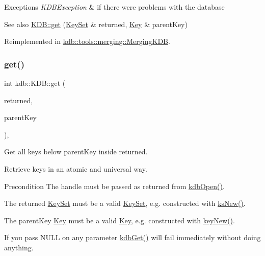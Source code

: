\begin{DoxyExceptions}{Exceptions}
{\em K\+D\+B\+Exception} & if there were problems with the database\\
\hline
\end{DoxyExceptions}
\begin{DoxySeeAlso}{See also}
\hyperlink{classkdb_1_1KDB_a0419ffbc273c89756bc523b4223ec25a}{K\+D\+B\+::get} (\hyperlink{classkdb_1_1KeySet}{Key\+Set} \& returned, \hyperlink{classkdb_1_1Key}{Key} \& parent\+Key) 
\end{DoxySeeAlso}


Reimplemented in \hyperlink{classkdb_1_1tools_1_1merging_1_1MergingKDB_a0d2a28f24aeb6ba3e81af73ef8b98df7}{kdb\+::tools\+::merging\+::\+Merging\+K\+DB}.

\mbox{\label{classkdb_1_1KDB_a48770a7290699bf2b7529f3ab67e378f}} 
\subsubsection{\texorpdfstring{get()}{get()}\hspace{0.1cm}{\footnotesize\ttfamily [2/2]}}
{\footnotesize\ttfamily int kdb\+::\+K\+D\+B\+::get (\begin{DoxyParamCaption}\item[{\hyperlink{classkdb_1_1KeySet}{Key\+Set} \&}]{returned,  }\item[{\hyperlink{classkdb_1_1Key}{Key} \&}]{parent\+Key }\end{DoxyParamCaption})\hspace{0.3cm}{\ttfamily [inline]}, {\ttfamily [virtual]}}



Get all keys below parent\+Key inside returned. 

Retrieve keys in an atomic and universal way. \begin{DoxyPrecond}{Precondition}
The {\ttfamily handle} must be passed as returned from \hyperlink{group__kdb_ga6808defe5870f328dd17910aacbdc6ca}{kdb\+Open()}.

The {\ttfamily returned} \hyperlink{classkdb_1_1KeySet}{Key\+Set} must be a valid \hyperlink{classkdb_1_1KeySet}{Key\+Set}, e.\+g. constructed with \hyperlink{group__keyset_ga671e1aaee3ae9dc13b4834a4ddbd2c3c}{ks\+New()}.

The {\ttfamily parent\+Key} \hyperlink{classkdb_1_1Key}{Key} must be a valid \hyperlink{classkdb_1_1Key}{Key}, e.\+g. constructed with \hyperlink{group__key_gad23c65b44bf48d773759e1f9a4d43b89}{key\+New()}.
\end{DoxyPrecond}
If you pass N\+U\+LL on any parameter \hyperlink{group__kdb_ga28e385fd9cb7ccfe0b2f1ed2f62453a1}{kdb\+Get()} will fail immediately without doing anything.

